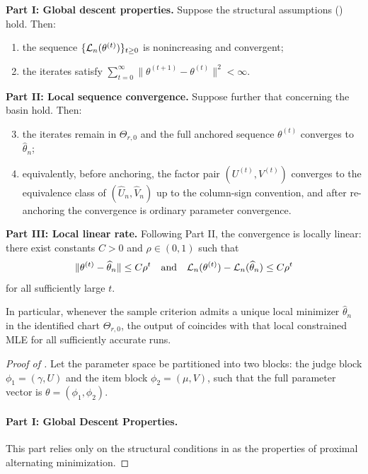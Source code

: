 \documentclass{article}
\begin{document}
\begin{bibunit}[unsrtnat]
\begin{proposition}
\textbf{Part I: Global descent properties.} Suppose the structural assumptions () hold. Then:
\begin{enumerate}
    \item the sequence $\{\mathcal{L}_n(\theta^{(t)})\}_{t\ge 0}$ is nonincreasing and convergent;
    \item the iterates satisfy $\sum_{t=0}^\infty \|\theta^{(t+1)}-\theta^{(t)}\|^2 < \infty$.
\end{enumerate}

\textbf{Part II: Local sequence convergence.} Suppose further that  concerning the basin hold. Then:
\begin{enumerate}
    \setcounter{enumi}{2}
    \item the iterates remain in $\Theta_{r,0}$ and the full anchored sequence $\theta^{(t)}$ converges to $\hat\theta_n$;
    \item equivalently, before anchoring, the factor pair $(U^{(t)},V^{(t)})$ converges to the equivalence class of $(\hat U_n,\hat V_n)$ up to the column-sign convention, and after re-anchoring the convergence is ordinary parameter convergence.
\end{enumerate}

\textbf{Part III: Local linear rate.} Following Part II, the convergence is locally linear: there exist constants $C>0$ and $\rho\in(0,1)$ such that
\[
\|\theta^{(t)}-\widehat\theta_n\| \le C\rho^t
\quad\text{and}\quad
\mathcal{L}_n(\theta^{(t)})-\mathcal{L}_n(\widehat\theta_n) \le C\rho^t
\]
for all sufficiently large $t$.
\end{proposition}
In particular, whenever the sample criterion admits a unique local minimizer $\hat\theta_n$ in the identified chart $\Theta_{r,0}$, the output of  coincides with that local constrained MLE for all sufficiently accurate runs.
\begin{proof}[Proof of ]
Let the parameter space be partitioned into two blocks: the judge block $\phi_1 = (\gamma, U)$ and the item block $\phi_2 = (\mu, V)$, such that the full parameter vector is $\theta = (\phi_1, \phi_2)$.

\paragraph{Part I: Global Descent Properties.} 
This part relies only on the structural conditions in  as the properties of proximal alternating minimization.


\end{proof}
\end{bibunit}
\end{document}
